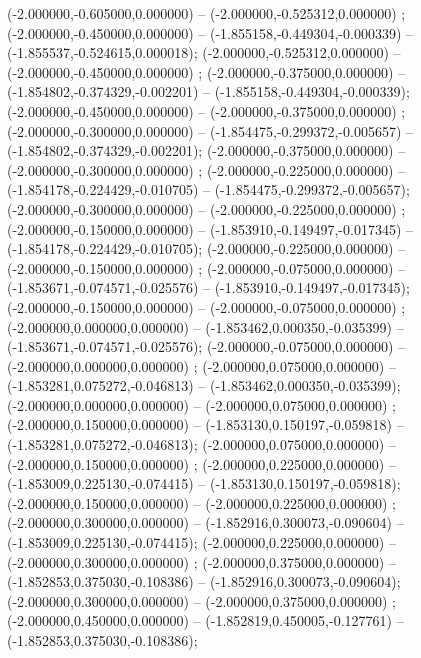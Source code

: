  (-2.000000,-0.605000,0.000000) -- (-2.000000,-0.525312,0.000000) ;
 (-2.000000,-0.450000,0.000000) -- (-1.855158,-0.449304,-0.000339) -- (-1.855537,-0.524615,0.000018);
 (-2.000000,-0.525312,0.000000) -- (-2.000000,-0.450000,0.000000) ;
 (-2.000000,-0.375000,0.000000) -- (-1.854802,-0.374329,-0.002201) -- (-1.855158,-0.449304,-0.000339);
 (-2.000000,-0.450000,0.000000) -- (-2.000000,-0.375000,0.000000) ;
 (-2.000000,-0.300000,0.000000) -- (-1.854475,-0.299372,-0.005657) -- (-1.854802,-0.374329,-0.002201);
 (-2.000000,-0.375000,0.000000) -- (-2.000000,-0.300000,0.000000) ;
 (-2.000000,-0.225000,0.000000) -- (-1.854178,-0.224429,-0.010705) -- (-1.854475,-0.299372,-0.005657);
 (-2.000000,-0.300000,0.000000) -- (-2.000000,-0.225000,0.000000) ;
 (-2.000000,-0.150000,0.000000) -- (-1.853910,-0.149497,-0.017345) -- (-1.854178,-0.224429,-0.010705);
 (-2.000000,-0.225000,0.000000) -- (-2.000000,-0.150000,0.000000) ;
 (-2.000000,-0.075000,0.000000) -- (-1.853671,-0.074571,-0.025576) -- (-1.853910,-0.149497,-0.017345);
 (-2.000000,-0.150000,0.000000) -- (-2.000000,-0.075000,0.000000) ;
 (-2.000000,0.000000,0.000000) -- (-1.853462,0.000350,-0.035399) -- (-1.853671,-0.074571,-0.025576);
 (-2.000000,-0.075000,0.000000) -- (-2.000000,0.000000,0.000000) ;
 (-2.000000,0.075000,0.000000) -- (-1.853281,0.075272,-0.046813) -- (-1.853462,0.000350,-0.035399);
 (-2.000000,0.000000,0.000000) -- (-2.000000,0.075000,0.000000) ;
 (-2.000000,0.150000,0.000000) -- (-1.853130,0.150197,-0.059818) -- (-1.853281,0.075272,-0.046813);
 (-2.000000,0.075000,0.000000) -- (-2.000000,0.150000,0.000000) ;
 (-2.000000,0.225000,0.000000) -- (-1.853009,0.225130,-0.074415) -- (-1.853130,0.150197,-0.059818);
 (-2.000000,0.150000,0.000000) -- (-2.000000,0.225000,0.000000) ;
 (-2.000000,0.300000,0.000000) -- (-1.852916,0.300073,-0.090604) -- (-1.853009,0.225130,-0.074415);
 (-2.000000,0.225000,0.000000) -- (-2.000000,0.300000,0.000000) ;
 (-2.000000,0.375000,0.000000) -- (-1.852853,0.375030,-0.108386) -- (-1.852916,0.300073,-0.090604);
 (-2.000000,0.300000,0.000000) -- (-2.000000,0.375000,0.000000) ;
 (-2.000000,0.450000,0.000000) -- (-1.852819,0.450005,-0.127761) -- (-1.852853,0.375030,-0.108386);
